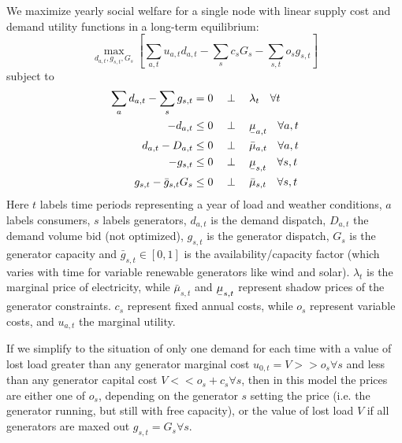 \documentclass[final,3p,times]{elsarticle}
\newcommand{\ubar}[1]{\text{\b{$#1$}}}
\def\l{\lambda}
\begin{document}
We maximize yearly social welfare for a single node with linear supply cost and demand utility functions in a long-term equilibrium:
\begin{equation}
    \max_{d_{a,t}, g_{s,t}, G_s}\left[\sum_{a,t} u_{a,t} d_{a,t} -  \sum_s c_s G_s - \sum_{s,t} o_{s} g_{s,t}\right]  \label{eq:objl}
\end{equation}
subject to
\begin{align}
   \sum_a d_{a,t} - \sum_s g_{s,t} & =  0 \hspace{0.34cm}\perp \hspace{0.34cm} \l_t \hspace{0.34cm} \forall t \label{eq:balance}\\
    -d_{a,t} & \leq 0 \hspace{0.34cm}\perp \hspace{0.34cm} \ubar{\mu}_{a,t} \hspace{0.34cm} \forall a,t \\
    d_{a,t} - D_{a,t} & \leq 0 \hspace{0.34cm}\perp \hspace{0.34cm} \bar{\mu}_{a,t} \hspace{0.34cm} \forall a,t \\
    -g_{s,t} & \leq 0 \hspace{0.34cm}\perp \hspace{0.34cm} \ubar{\mu}_{s,t} \hspace{0.34cm} \forall s,t \\
         g_{s,t} - \bar{g}_{s,t} G_s & \leq 0 \hspace{0.34cm}\perp \hspace{0.34cm} \bar{\mu}_{s,t} \hspace{0.34cm} \forall s,t
\end{align}
Here $t$ labels time periods representing a year of load and weather conditions, $a$ labels consumers, $s$ labels generators, $d_{a,t}$ is the
demand dispatch, $D_{a,t}$ the demand volume bid (not optimized), $g_{s,t}$ is the generator dispatch, $G_s$ is the generator
capacity and $\bar{g}_{s,t}\in[0,1]$ is the availability/capacity factor (which
varies with time for variable renewable generators like wind and
solar). $\l_t$ is the marginal price of electricity, while
$\bar{\mu}_{s,t}$ and $\ubar{\mu}_{s,t}$ represent shadow prices of
the generator constraints. $c_s$ represent fixed annual costs, while
$o_s$ represent variable costs, and $u_{a,t}$ the marginal utility.

If we simplify to the situation of only one demand for each time with
a value of lost load greater than any generator marginal cost $u_{0,t}
= V >> o_s \forall s$ and less than any generator capital cost $V <<
o_s + c_s \forall s$, then in this model the prices are either one of $o_s$,
depending on the generator $s$ setting the price (i.e. the generator
running, but still with free capacity), or the value of lost load $V$
if all generators are maxed out $g_{s,t} = G_s \forall s$.
\end{document}
